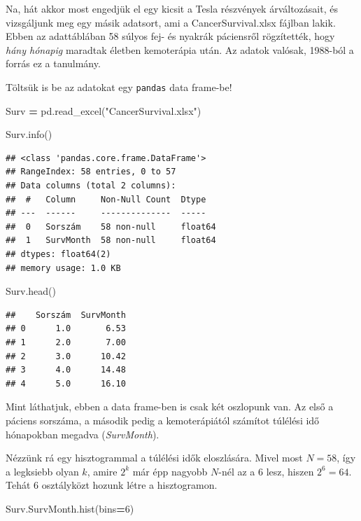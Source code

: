 \documentclass[
]{book}
\newenvironment{Shaded}{\begin{snugshade}}{\end{snugshade}}
\newcommand{\DecValTok}[1]{\textcolor[rgb]{0.00,0.00,0.81}{#1}}
\newcommand{\NormalTok}[1]{#1}
\newcommand{\OperatorTok}[1]{\textcolor[rgb]{0.81,0.36,0.00}{\textbf{#1}}}
\newcommand{\StringTok}[1]{\textcolor[rgb]{0.31,0.60,0.02}{#1}}
\begin{document}
Na, hát akkor most engedjük el egy kicsit a Tesla részvények árváltozásait, és vizsgáljunk meg egy másik adatsort, ami a CancerSurvival.xlsx fájlban lakik. Ebben az adattáblában 58 súlyos fej- és nyakrák páciensről rögzítették, hogy \emph{hány hónapig} maradtak életben kemoterápia után. Az adatok valósak, 1988-ból a forrás ez a tanulmány.

Töltsük is be az adatokat egy \texttt{pandas} data frame-be!

\begin{Shaded}
\begin{Highlighting}[]
\NormalTok{Surv }\OperatorTok{=}\NormalTok{ pd.read\_excel(}\StringTok{"CancerSurvival.xlsx"}\NormalTok{)}

\NormalTok{Surv.info()}
\end{Highlighting}
\end{Shaded}

\begin{verbatim}
## <class 'pandas.core.frame.DataFrame'>
## RangeIndex: 58 entries, 0 to 57
## Data columns (total 2 columns):
##  #   Column     Non-Null Count  Dtype  
## ---  ------     --------------  -----  
##  0   Sorszám    58 non-null     float64
##  1   SurvMonth  58 non-null     float64
## dtypes: float64(2)
## memory usage: 1.0 KB
\end{verbatim}

\begin{Shaded}
\begin{Highlighting}[]
\NormalTok{Surv.head()}
\end{Highlighting}
\end{Shaded}

\begin{verbatim}
##    Sorszám  SurvMonth
## 0      1.0       6.53
## 1      2.0       7.00
## 2      3.0      10.42
## 3      4.0      14.48
## 4      5.0      16.10
\end{verbatim}

Mint láthatjuk, ebben a data frame-ben is csak két oszlopunk van. Az első a páciens sorszáma, a második pedig a kemoterápiától számítot túlélési idő hónapokban megadva (\emph{SurvMonth}).

Nézzünk rá egy hisztogrammal a túlélési idők eloszlására. Mivel most \(N=58\), így a legksiebb olyan \(k\), amire \(2^k\) már épp nagyobb \(N\)-nél az a 6 lesz, hiszen \(2^6=64\). Tehát \(6\) osztályközt hozunk létre a hisztogramon.

\begin{Shaded}
\begin{Highlighting}[]
\NormalTok{Surv.SurvMonth.hist(bins}\OperatorTok{=}\DecValTok{6}\NormalTok{)}
\end{Highlighting}
\end{Shaded}
\end{document}
